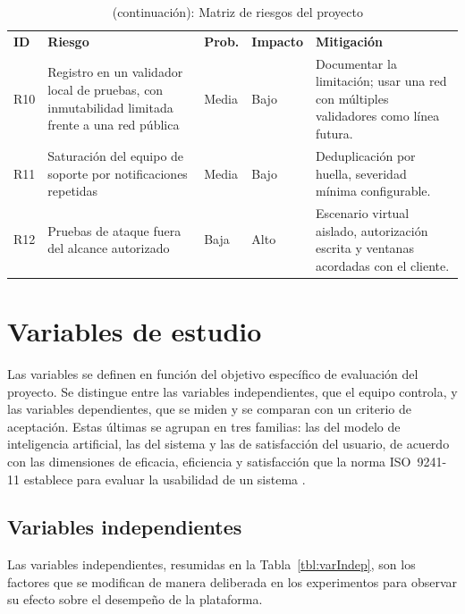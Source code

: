 \clearpage
\begin{table}[H]
\centering
\footnotesize
\renewcommand{\arraystretch}{1.15}
\setlength{\tabcolsep}{3.5pt}
\caption*{{\fontsize{11pt}{13}\selectfont \tablename~\thetable{} (continuación): Matriz de riesgos del proyecto}}
\begin{tabular}{@{}L{0.9cm}L{4.4cm}L{1.3cm}L{1.45cm}L{7.05cm}@{}}
\textbf{ID} & \textbf{Riesgo} & \textbf{Prob.} & \textbf{Impacto} & \textbf{Mitigación} \\
R10 & Registro en un validador local de pruebas, con inmutabilidad limitada frente a una red pública & Media & Bajo & Documentar la limitación; usar una red con múltiples validadores como línea futura. \\
R11 & Saturación del equipo de soporte por notificaciones repetidas & Media & Bajo & Deduplicación por huella, severidad mínima configurable. \\
R12 & Pruebas de ataque fuera del alcance autorizado & Baja & Alto & Escenario virtual aislado, autorización escrita y ventanas acordadas con el cliente. \\
\end{tabular}
\end{table}

\section{Variables de estudio}
\label{sec:variables}

Las variables se definen en función del objetivo específico de evaluación del proyecto. Se distingue entre las variables independientes, que el equipo controla, y las variables dependientes, que se miden y se comparan con un criterio de aceptación. Estas últimas se agrupan en tres familias: las del modelo de inteligencia artificial, las del sistema y las de satisfacción del usuario, de acuerdo con las dimensiones de eficacia, eficiencia y satisfacción que la norma ISO~9241-11 establece para evaluar la usabilidad de un sistema \parencite{iso9241}.

\subsection{Variables independientes}

Las variables independientes, resumidas en la Tabla~\ref{tbl:varIndep}, son los factores que se modifican de manera deliberada en los experimentos para observar su efecto sobre el desempeño de la plataforma.

